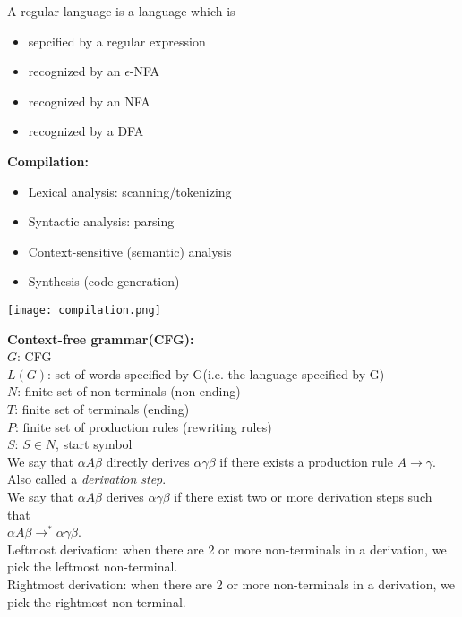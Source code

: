 \documentclass[12pt]{article}
\begin{document}
\noindent
A regular language is a language which is
\begin{itemize}
	\renewcommand\labelitemi{--}
	\item sepcified by a regular expression
	\item recognized by an $\epsilon$-NFA
	\item recognized by an NFA
	\item recognized by a DFA
\end{itemize}
\vspace{2mm}
\begin{minipage}{0.6\linewidth}
	\textbf{Compilation:}
	\begin{itemize}
		\renewcommand\labelitemi{--}
		\item Lexical analysis: scanning/tokenizing
		\item Syntactic analysis: parsing
		\item Context-sensitive (semantic) analysis
		\item Synthesis (code generation)
	\end{itemize}
\end{minipage}
\begin{minipage}{0.4\linewidth}
	\texttt{[image: compilation.png]}
\end{minipage}


\clearpage
\noindent
\textbf{Context-free grammar(CFG):}\\

\noindent
$G$: CFG\\
$L(G)$: set of words specified by G(i.e. the language specified by G)\\
$N$: finite set of non-terminals (non-ending)\\
$T$: finite set of terminals (ending)\\
$P$: finite set of production rules (rewriting rules)\\
$S$: $S \in N$, start symbol\\

\noindent
We say that $\alpha A \beta$ directly derives $\alpha \gamma \beta$ if there exists a production rule $A \rightarrow \gamma$. Also called a \emph{derivation step}. \\
We say that $\alpha A \beta$ derives $\alpha \gamma \beta$ if there exist two or more derivation steps such that \\
$\alpha A \beta \rightarrow^{\ast} \alpha \gamma \beta$. \\

\noindent
Leftmost derivation: when there are 2 or more non-terminals in a derivation, we pick the leftmost non-terminal.\\
Rightmost derivation: when there are 2 or more non-terminals in a derivation, we pick the rightmost non-terminal.\\
\end{document}
